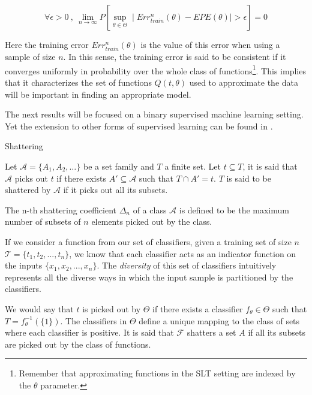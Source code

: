 \begin{equation}
\forall \epsilon > 0 \ , \ \lim_{n\to\infty} P\left[ \sup_{\theta \in \Theta} \mid Err^{n}_{train}(\theta) - EPE(\theta) \mid  > \epsilon  \right] = 0 
\end{equation}

Here the training error $Err^{n}_{train}(\theta)$ is the value of this error when using a sample of size $n$. In this sense, the training error is said to be consistent if it converges uniformly in probability over the whole class of functions\footnote{Remember that approximating functions in the SLT setting are indexed by the $\theta$ parameter.}. This implies that it characterizes the set of functions $Q(t,\theta)$ used to approximate the data will be important in finding an appropriate model. %

The next results will be focused on a binary supervised machine learning setting. Yet the extension to other forms of supervised learning can be found in \textcite{cherkassky-learning2007}.

\begin{definition}{Shattering}

Let $\mathcal {A}= \{A_1,A_{2},\dots \}$ be a set family and $T$ a finite set. Let $t \subseteq T$, it is said that $\mathcal {A}$ picks out $t$ if there exists $A' \subseteq \mathcal {A} $ such that $ T \cap A' = t$. $T$ is said to be shattered by $\mathcal {A}$ if it picks out all its subsets.


\end{definition}

The n-th shattering coefficient $\Delta_n$ of a class $\mathcal {A}$ is defined to be the maximum number of subsets of $n$ elements picked out by the class.

If we consider a function from our set of classifiers, given a training set of size $n$
$\mathcal {T} = \{ t_1,t_2,...,t_n \}$, we know that each classifier acts as an indicator function on the inputs $\{ x_1,x_2,...,x_n \}$. The \textit{diversity} of this set of classifiers intuitively represents all the diverse ways in which the input sample is partitioned by the classifiers.

We would say that $t$ is picked out by $\Theta$ if there exists a classifier $f_{\theta} \in \Theta$ such that $T = f_{\theta}^{-1}(\{1\})$. The classifiers in $\Theta$ define a unique mapping to the class of sets where each classifier is positive. It is said that $\mathcal {F}$ shatters a set $A$ if all its subsets are picked out by the class of functions.

